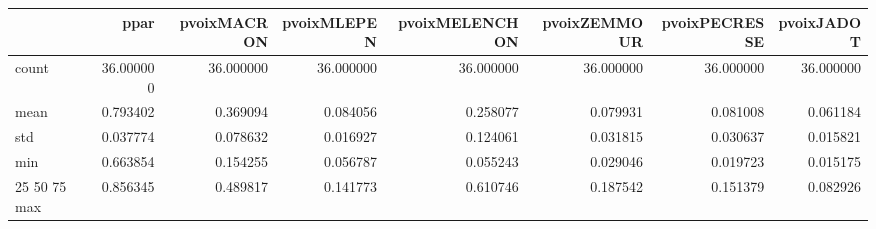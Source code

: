 \begin{tabular}{lrrrrrrr}
\toprule
 & ppar & pvoixMACRON & pvoixMLEPEN & pvoixMELENCHON & pvoixZEMMOUR & pvoixPECRESSE & pvoixJADOT \\
\midrule
count & 36.000000 & 36.000000 & 36.000000 & 36.000000 & 36.000000 & 36.000000 & 36.000000 \\
mean & 0.793402 & 0.369094 & 0.084056 & 0.258077 & 0.079931 & 0.081008 & 0.061184 \\
std & 0.037774 & 0.078632 & 0.016927 & 0.124061 & 0.031815 & 0.030637 & 0.015821 \\
min & 0.663854 & 0.154255 & 0.056787 & 0.055243 & 0.029046 & 0.019723 & 0.015175 \\
25%
50%
75%
max & 0.856345 & 0.489817 & 0.141773 & 0.610746 & 0.187542 & 0.151379 & 0.082926 \\
\bottomrule
\end{tabular}
